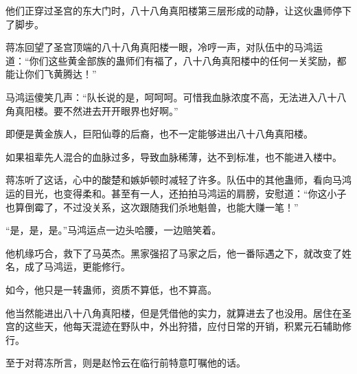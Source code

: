 \begin{this_body}
他们正穿过圣宫的东大门时，八十八角真阳楼第三层形成的动静，让这伙蛊师停下了脚步。

蒋冻回望了圣宫顶端的八十八角真阳楼一眼，冷哼一声，对队伍中的马鸿运道：“你们这些黄金部族的蛊师们有福了，八十八角真阳楼中的任何一关奖励，都能让你们飞黄腾达！”

马鸿运傻笑几声：“队长说的是，呵呵呵。可惜我血脉浓度不高，无法进入八十八角真阳楼。要不然进去开开眼界也好啊。”

即便是黄金族人，巨阳仙尊的后裔，也不一定能够进出八十八角真阳楼。

如果祖辈先人混合的血脉过多，导致血脉稀薄，达不到标准，也不能进入楼中。

蒋冻听了这话，心中的酸楚和嫉妒顿时减轻了许多。队伍中的其他蛊师，看向马鸿运的目光，也变得柔和。甚至有一人，还拍拍马鸿运的肩膀，安慰道：“你这小子也算倒霉了，不过没关系，这次跟随我们杀地魁兽，也能大赚一笔！”

“是，是，是。”马鸿运点一边头哈腰，一边赔笑着。

他机缘巧合，救下了马英杰。黑家强招了马家之后，他一番际遇之下，就改变了姓名，成了马鸿运，更能修行。

如今，他只是一转蛊师，资质不算低，也不算高。

他当然能进出八十八角真阳楼，但是凭借他的实力，就算进去了也没用。居住在圣宫的这些天，他每天混迹在野队中，外出狩猎，应付日常的开销，积累元石辅助修行。

至于对蒋冻所言，则是赵怜云在临行前特意叮嘱他的话。

\end{this_body}

